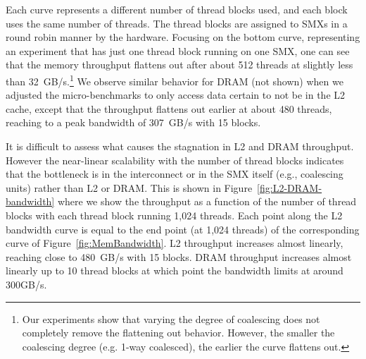 

Each curve represents a different number of thread blocks used, and each block uses the same number of threads.
The thread blocks are assigned to SMXs in a round robin manner by the hardware.
Focusing on the bottom curve, representing an experiment that has just one thread block running on
one SMX, one can see that the memory throughput flattens out after about 512 threads at slightly less
than 32~GB/s.\footnote{
    Our experiments show that varying the degree of coalescing does not completely
    remove the flattening out behavior. 
    However, the smaller the coalescing degree (e.g. 1-way coalesced), the
    earlier the curve flattens out.}
We observe similar behavior for DRAM (not shown) when we adjusted the micro-benchmarks to only access data certain to not be in the L2 cache, except that the throughput flattens out
earlier at about 480 threads, reaching to a peak bandwidth of 307~GB/s with 15 blocks.


It is difficult to assess what causes the stagnation in L2 and DRAM throughput.
However the near-linear scalability with the number of thread blocks indicates that the bottleneck
is in the interconnect or in the SMX itself (e.g., coalescing units) rather than L2 or DRAM.
This is shown in Figure~\ref{fig:L2-DRAM-bandwidth} where we show the throughput as a function of
the number of thread blocks with each thread block running 1,024 threads.
Each point along the L2 bandwidth curve is equal to the end point (at 1,024 threads) of the corresponding curve of
Figure~\ref{fig:MemBandwidth}.
L2 throughput increases almost linearly, reaching close to 480~GB/s with 15 blocks. DRAM throughput increases
almost linearly up to 10 thread blocks at which point the bandwidth limits at around 300GB/s.

